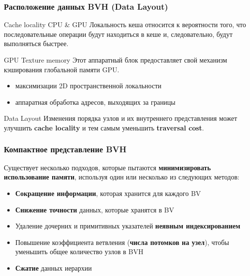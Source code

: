 \documentclass{beamer}
\begin{document}
\begin{frame}
    \frametitle{Расположение данных BVH (Data Layout)}
    \begin{block}{Cache locality CPU \& GPU}
        Локальность кеша относится к вероятности того,
        что последовательные операции будут находиться в кеше и,
        следовательно, будут выполняться быстрее.
    \end{block}
    \begin{block}{GPU Texture memory}
        Этот аппаратный блок предоставляет свой механизм кэширования глобальной памяти GPU.
        \begin{itemize}
            \item
                максимизации 2D пространственной локальности
            \item
                аппаратная обработка адресов, выходящих за границы
        \end{itemize}
    \end{block}
    \begin{block}{Data Layout}
        Изменения порядка узлов и их внутреннего представления может улучшить \textbf{cache locality}
        и тем самым уменьшить \textbf{traversal cost}.
    \end{block}
\end{frame}

\begin{frame}[t]
    \frametitle{Компактное представление BVH}
    Существует несколько подходов, которые пытаются \textbf{минимизировать использование памяти}, используя один или несколько из следующих методов:
    \begin{itemize}
        \item
            \textbf{Сокращение информации}, которая хранится для каждого BV
        \item
            \textbf{Снижение точности} данных, которые хранятся в BV
        \item
            Удаление дочерних и примитивных указателей \textbf{неявным индексированием}
        \item
            Повышение коэффициента ветвления (\textbf{числа потомков на узел}), чтобы уменьшить общее количество узлов в BVH
        \item
            \textbf{Сжатие} данных иерархии
    \end{itemize}

\end{frame}
\end{document}
